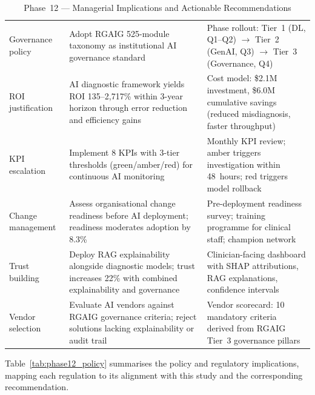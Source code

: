 \begingroup\singlespacing\tablefontsize\tablestripes
\begin{xltabular}{\textwidth}{@{} l X X @{}}
\caption{Phase~12 --- Managerial Implications and Actionable Recommendations}
\label{tab:phase12_managerial}\\
\toprule
{} &  &  \\
\midrule
\endfirsthead
\endhead
\bottomrule
\endlastfoot
Governance policy        & Adopt RGAIG 525-module taxonomy as institutional AI governance standard & Phase rollout: Tier~1 (DL, Q1--Q2) $\rightarrow$ Tier~2 (GenAI, Q3) $\rightarrow$ Tier~3 (Governance, Q4) \\
\addlinespace
ROI justification        & AI diagnostic framework yields ROI 135--2{,}717\% within 3-year horizon through error reduction and efficiency gains & Cost model: \$2.1M investment, \$6.0M cumulative savings (reduced misdiagnosis, faster throughput) \\
\addlinespace
KPI escalation           & Implement 8 KPIs with 3-tier thresholds (green/amber/red) for continuous AI monitoring & Monthly KPI review; amber triggers investigation within 48~hours; red triggers model rollback \\
\addlinespace
Change management        & Assess organisational change readiness before AI deployment; readiness moderates adoption by 8.3\% & Pre-deployment readiness survey; training programme for clinical staff; champion network \\
\addlinespace
Trust building           & Deploy RAG explainability alongside diagnostic models; trust increases 22\% with combined explainability and governance & Clinician-facing dashboard with SHAP attributions, RAG explanations, confidence intervals \\
\addlinespace
Vendor selection         & Evaluate AI vendors against RGAIG governance criteria; reject solutions lacking explainability or audit trail & Vendor scorecard: 10 mandatory criteria derived from RGAIG Tier~3 governance pillars \\
\end{xltabular}
\endgroup

\vspace{1.5em}

Table~\ref{tab:phase12_policy} summarises the policy and regulatory implications, mapping each regulation to its alignment with this study and the corresponding recommendation.

